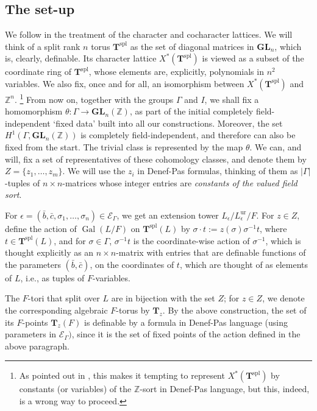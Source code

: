 \documentclass{amsart}
\newcommand{\Z}{{\mathbb Z}}
\newcommand{\GL}{\mathbf {GL}}
\newcommand{\gal}{\operatorname{Gal}}
\newcommand{\ur}{\mathrm{ur}}
\newcommand{\bT}{\mathbf {T}}
\newcommand\cE{{\mathcal E}}
\newcommand\spl{\mathrm{spl}}
\theoremstyle{plain}
\theoremstyle{definition}
\begin{document}
\subsection{The set-up}
We follow \cite{cluckers-hales-loeser} in the treatment of the character and cocharacter lattices.
We will think of a split rank $n$ torus ${\bT}^\spl$ as the set of diagonal matrices in $\GL_n$, which is, clearly, definable. Its character lattice $X^\ast({\bT}^\spl)$ is viewed as a subset of the coordinate ring of $\bT^\spl$, whose elements are, explicitly, polynomials in $n^2$ variables. 
We also fix, once and for all, an isomorphism between $X^\ast(\bT^\spl)$ and $\Z^n$. 
\footnote{As pointed out in \cite{cluckers-hales-loeser}, this makes it tempting to represent 
$X^\ast(\bT^\spl)$ by constants (or variables) of the $\Z$-sort in Denef-Pas language, but this, indeed, is a wrong way to proceed.}
From now on, together with the groups $\Gamma$ and $I$, we shall fix a homomorphism
$\theta:\Gamma \to \GL_n(\Z)$, as part of the initial completely field-independent `fixed data' built into all our constructions.
Moreover, the set $H^1(\Gamma, \GL_n(\Z))$ is completely field-independent, and therefore can also be fixed from the start. The trivial class is represented by the map $\theta$.  We can, and will, fix a set of representatives of these cohomology classes, and denote them by $Z=\{z_1, \dots, z_m\}$. We will use the $z_i$ in Denef-Pas formulas, thinking of them as $|\Gamma|$-tuples of $n\times n$-matrices whose integer entries are \emph{constants of the valued  field sort}. 
 
For $\epsilon=(\bar b, \bar c, \sigma_1, \dots, \sigma_n)\in \cE_\Gamma$, we get an extension tower 
$L_\epsilon/L_\epsilon^\ur/F$. For $z\in Z$, define the action of $\gal(L/F)$ on $\bT^\spl(L)$ by
$\sigma\cdot  t:=z(\sigma)\sigma^{-1}t$, where $t\in \bT^\spl(L)$, and for $\sigma\in \Gamma$, 
$\sigma^{-1}t$ is the coordinate-wise action of $\sigma^{-1}$, which is thought explicitly as an $n\times n$-matrix with entries that are definable functions of the parameters $(\bar b, \bar c)$, on the coordinates of $t$, which are thought of as elements of $L$, i.e., as tuples of $F$-variables. 

The $F$-tori that split over $L$ are in bijection with  the set $Z$; 
for $z\in Z$, we denote the corresponding algebraic $F$-torus by $\bT_z$. 
By the above construction, the set of its $F$-points $\bT_z(F)$ is definable by a formula in Denef-Pas language (using parameters in $\cE_\Gamma)$, since it is the set of fixed points of the action defined in the above paragraph. 
\end{document}
